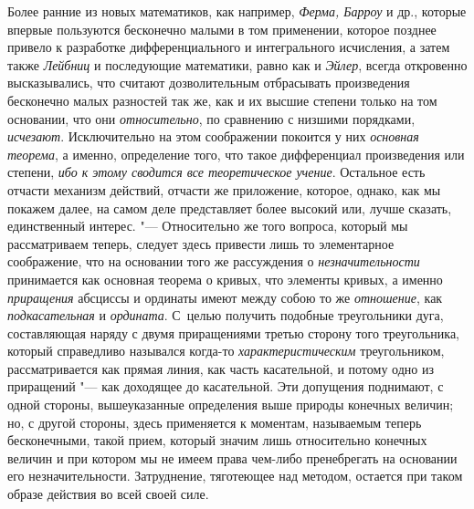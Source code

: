 Более ранние из новых математиков, как например, {\em Ферма, Барроу} и
др., которые впервые пользуются бесконечно малыми в том применении, которое
позднее привело к разработке дифференциального и интегрального исчисления, а
затем также {\em Лейбниц} и последующие математики, равно как и {\em Эйлер},
всегда откровенно высказывались, что считают дозволительным отбрасывать
произведения бесконечно малых разностей так же, как и их высшие степени только
на том основании, что они {\em относительно}, по сравнению с низшими порядками,
{\em исчезают}. Исключительно на этом соображении покоится у них
{\em основная теорема}, а именно, определение того, что такое дифференциал
произведения или степени, {\em ибо к этому сводится все теоретическое
учение}. Остальное есть отчасти механизм действий, отчасти же приложение,
которое, однако, как мы покажем далее, на самом деле представляет более высокий
или, лучше сказать, единственный интерес. "--- Относительно же того вопроса,
который мы рассматриваем теперь, следует здесь привести лишь то элементарное
соображение, что на основании того же рассуждения о {\em незначительности}
принимается как основная теорема о кривых, что элементы кривых, а именно
{\em приращения} абсциссы и ординаты имеют между собою то же {\em отношение},
как {\em подкасательная} и {\em ордината}. С~целью получить подобные
треугольники дуга, составляющая наряду с двумя приращениями третью сторону того
треугольника, который справедливо назывался когда-то {\em характеристическим}
треугольником, рассматривается как прямая линия, как часть касательной, и
потому одно из приращений "--- как доходящее до касательной. Эти допущения
поднимают, с одной стороны, вышеуказанные определения выше природы конечных
величин; но, с другой стороны, здесь применяется к моментам, называемым теперь
бесконечными, такой прием, который значим лишь относительно конечных величин и
при котором мы не имеем права чем-либо пренебрегать на основании его
незначительности. Затруднение, тяготеющее над методом, остается при таком
образе действия во всей своей силе.

